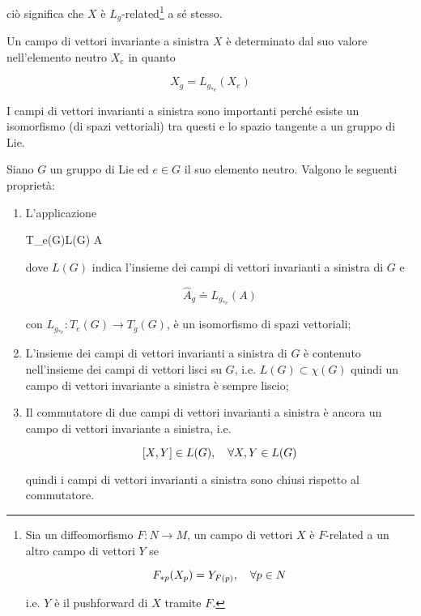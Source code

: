 ciò significa che $ X $ è $ L_{g} $-related\footnote{%
	Sia un diffeomorfismo $ F : N \to M $, un campo di vettori $ X $ è $ F $-related a un altro campo di vettori $ Y $ se
	
	\begin{equation*}
		F_{*p}(X_{p}) = Y_{F(p)} \qcomma \forall p \in N
	\end{equation*}

	i.e. $ Y $ è il pushforward di $ X $ tramite $ F $.%
} a sé stesso.

\begin{remark}
	Un campo di vettori invariante a sinistra $ X $ è determinato dal suo valore nell'elemento neutro $ X_{e} $ in quanto
	
	\begin{equation}
		X_{g} = L_{g_{*e}} (X_{e})
	\end{equation}
\end{remark}

I campi di vettori invarianti a sinistra sono importanti perché esiste un isomorfismo (di spazi vettoriali) tra questi e lo spazio tangente a un gruppo di Lie.

\begin{theorem}
	Siano $ G $ un gruppo di Lie ed $ e \in G $ il suo elemento neutro. Valgono le seguenti proprietà:
	
	\begin{enumerate}
		\item L'applicazione
		
		\map{\hat{}}%
			{T_{e}(G)}{L(G)}%
			{A}{}
			
		dove $ L(G) $ indica l'insieme dei campi di vettori invarianti a sinistra di $ G $ e
		
		\begin{equation}
			\hat{A}_{g} \doteq L_{g_{*e}}(A)
		\end{equation}
	
		con $ L_{g_{*e}} : T_{e}(G) \to T_{g}(G) $, è un isomorfismo di spazi vettoriali;
		
		\item L'insieme dei campi di vettori invarianti a sinistra di $ G $ è contenuto nell'insieme dei campi di vettori lisci su $ G $, i.e. $ L(G) \subset \chi(G) $ quindi un campo di vettori invariante a sinistra è sempre liscio;
		
		\item Il commutatore di due campi di vettori invarianti a sinistra è ancora un campo di vettori invariante a sinistra, i.e.
		
		\begin{equation}
			\comm{X}{Y} \in L(G) \qcomma \forall X,Y \in L(G)
		\end{equation}
	
		quindi i campi di vettori invarianti a sinistra sono chiusi rispetto al commutatore.
	\end{enumerate}
\end{theorem}

